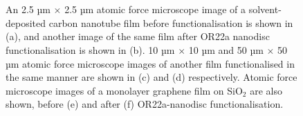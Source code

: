 \documentclass[
  a4paper,
]{scrbook}
\begin{document}
\begin{figure}
\begin{minipage}[t]{0.03\linewidth}
\end{minipage}%
%
\begin{minipage}[t]{0.01\linewidth}

{\centering 

~

}

\end{minipage}%
%
\begin{minipage}[t]{0.45\linewidth}

{\centering 


}

\end{minipage}%
%
\begin{minipage}[t]{0.01\linewidth}

{\centering 

~

}

\end{minipage}%

\caption{\label{fig-solvent-deposited-AFM-comparison}An 2.5 µm
\(\times\) 2.5 µm atomic force microscope image of a solvent-deposited
carbon nanotube film before functionalisation is shown in (a), and
another image of the same film after OR22a nanodisc functionalisation is
shown in (b). 10 µm \(\times\) 10 µm and 50 µm \(\times\) 50 µm atomic
force microscope images of another film functionalised in the same
manner are shown in (c) and (d) respectively. Atomic force microscope
images of a monolayer graphene film on SiO\(_2\) are also shown, before
(e) and after (f) OR22a-nanodisc functionalisation.}

\end{figure}
\end{document}
